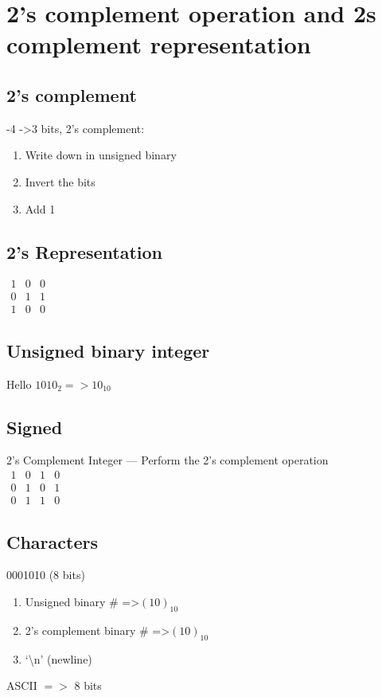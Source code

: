 \section{2's complement operation and 2s complement representation}
  \subsection{2's complement}
    -4 -\textgreater 3 bits, 2's complement:
    \begin{enumerate}
      \item Write down in unsigned binary
      \item Invert the bits
      \item Add 1
    \end{enumerate}

  \subsection{2's Representation}
    $
      \begin{matrix}
        1 & 0 & 0\\
        0 & 1 & 1\\
        1 & 0 & 0
      \end{matrix}
    $

  \subsection{Unsigned binary integer}
  Hello
    $1010_2 => 10_{10}$
  \subsection{Signed}
    2's Complement Integer --- Perform the 2's complement operation\\
    $
    \begin{matrix}
      1 & 0 & 1 & 0\\
      0 & 1 & 0 & 1\\
      0 & 1 & 1 & 0
    \end{matrix}
    $

    \subsection{Characters}
      0001010 (8 bits)
      \begin{enumerate}
        \item Unsigned binary \# =\textgreater $(10)_{10}$
        \item 2's complement binary \# =\textgreater $(10)_{10}$
        \item `\textbackslash n' (newline)
      \end{enumerate}
      ASCII $=>$ 8 bits
